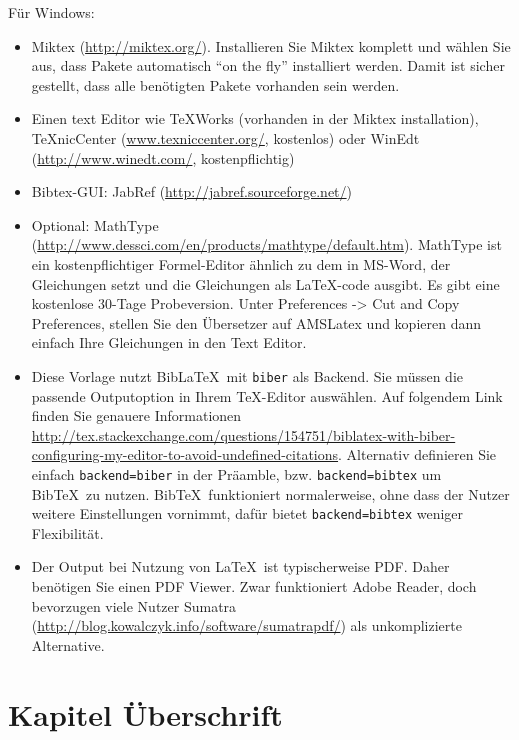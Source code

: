 \documentclass[a4paper,12pt]{scrartcl} %
\begin{document}
Für Windows:
\begin{itemize} %
	\item Miktex (\url{http://miktex.org/}). Installieren Sie Miktex komplett und wählen Sie aus, dass Pakete automatisch ``on the fly'' installiert werden. Damit ist sicher gestellt, dass alle benötigten Pakete vorhanden sein werden.
	\item Einen text Editor wie TeXWorks (vorhanden in der Miktex installation), TeXnicCenter (\url{www.texniccenter.org/}, kostenlos) oder WinEdt (\url{http://www.winedt.com/}, kostenpflichtig)
	\item Bibtex-GUI: JabRef (\url{http://jabref.sourceforge.net/})
	\item Optional: MathType (\url{http://www.dessci.com/en/products/mathtype/default.htm}). MathType ist ein kostenpflichtiger Formel-Editor ähnlich zu dem in MS-Word, der Gleichungen setzt und die Gleichungen als \LaTeX-code ausgibt. Es gibt eine kostenlose 30-Tage Probeversion. Unter Preferences -> Cut and Copy Preferences, stellen Sie den Übersetzer auf AMSLatex und kopieren dann einfach Ihre Gleichungen in den Text Editor.
	 \item Diese Vorlage nutzt Bib\LaTeX\ mit \texttt{biber} als Backend. Sie müssen die passende Outputoption in Ihrem \TeX-Editor auswählen. Auf folgendem Link finden Sie genauere Informationen \url{http://tex.stackexchange.com/questions/154751/biblatex-with-biber-configuring-my-editor-to-avoid-undefined-citations}. Alternativ definieren Sie einfach \texttt{backend=biber} in der Präamble, bzw. \texttt{backend=bibtex} um Bib\TeX\ zu nutzen. Bib\TeX\ funktioniert normalerweise, ohne dass der Nutzer weitere Einstellungen vornimmt, dafür bietet \texttt{backend=bibtex} weniger Flexibilität.
	\item Der Output bei Nutzung von \LaTeX\ ist typischerweise PDF. Daher benötigen Sie einen PDF Viewer. Zwar funktioniert Adobe Reader, doch bevorzugen viele Nutzer Sumatra (\url{http://blog.kowalczyk.info/software/sumatrapdf/}) als unkomplizierte Alternative.
\end{itemize}

\clearpage


\section{Kapitel Überschrift} \label{sec:Section1} %
\end{document}
